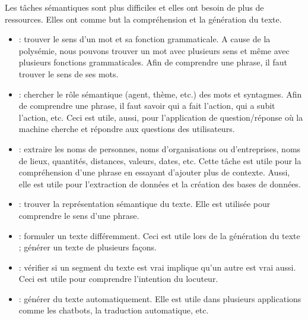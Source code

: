 \documentclass{KodeBook}
\begin{document}
Les tâches sémantiques sont plus difficiles et elles ont besoin de plus de ressources. 
Elles ont comme but la compréhension et la génération du texte. 
\begin{itemize}
	\item {} : trouver le sens d'un mot et sa fonction grammaticale. 
	A cause de la polysémie, nous pouvons trouver un mot avec plusieurs sens et même avec plusieurs fonctions grammaticales. 
	Afin de comprendre une phrase, il faut trouver le sens de ses mots.
	\item {} : chercher le rôle sémantique (agent, thème, etc.) des mots et syntagmes.
	Afin de comprendre une phrase, il faut savoir qui a fait l'action, qui a subit l'action, etc. 
	Ceci est utile, aussi, pour l'application de question/réponse où la machine cherche et répondre aux questions des utilisateurs.
	\item {} : extraire les noms de personnes, noms d'organisations ou d'entreprises, noms de lieux, quantités, distances, valeurs, dates, etc. 
	Cette tâche est utile pour la compréhension d'une phrase en essayant d'ajouter plus de contexte. 
	Aussi, elle est utile pour l'extraction de données et la création des bases de données.
	\item {} : trouver la représentation sémantique du texte. 
	Elle est utilisée pour comprendre le sens d'une phrase.
	\item {} : formuler un texte différemment. 
	Ceci est utile lors de la génération du texte ; générer un texte de plusieurs façons.
	\item {} : vérifier si un segment du texte est vrai implique qu'un autre est vrai aussi.
	Ceci est utile pour comprendre l'intention du locuteur.
	\item {} : générer du texte automatiquement. 
	Elle est utile dans plusieurs applications comme les chatbots, la traduction automatique, etc.
\end{itemize}
\end{document}
